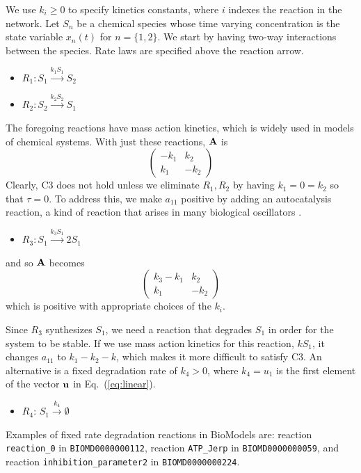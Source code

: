 \documentclass{bmcart}
\newcommand{\eqn}[1]{Eq.~(\ref{#1})}
\begin{document}
We use $k_i \geq 0$ to specify kinetics constants, where $i$ indexes the reaction in the network. Let $S_n$ be a chemical species whose time varying concentration is the state variable $x_n(t)$ for $n=\{1,2\}.$ We start by having two-way interactions between the species. Rate laws are specified above the reaction arrow.
\begin{itemize}
    \item $R_1: S_1 \xrightarrow{k_1 S_1} S_2$
    \item $R_2: S_2 \xrightarrow{k_2 S_2} S_1$
\end{itemize}
The foregoing reactions have mass action kinetics, which is widely used in models of chemical systems.
With just these reactions, ${\bf A}$ is
$$\left( \begin{matrix}
     - k_1 & k_2  \\
     k_1 & -k_2 
\end{matrix} \right)$$
Clearly, C3 does not hold unless we eliminate $R_1, R_2$ by having $k_1 = 0 = k_2$ so that $\tau = 0.$ To address this, we make $a_{11}$ positive by adding an autocatalysis reaction, a kind of reaction that
arises in many biological oscillators \cite{novichkov_autocatalytic_2021}.
\begin{itemize}
    \item $R_3: S_1 \xrightarrow{k_3 S_1} 2 S_1$
\end{itemize}
and so ${\bf A}$ becomes
$$\left( \begin{matrix}
     k_3 - k_1 & k_2  \\
     k_1 & -k_2
\end{matrix} \right)$$
which is positive with appropriate choices of the $k_i$.

Since $R_3$ synthesizes $S_1$, we need a reaction that degrades $S_1$ in order for the system to be stable. If we use mass action kinetics for this reaction, $kS_1$, it changes $a_{11}$ to $k_1-k_2-k$, which makes it more difficult to satisfy C3. An alternative is a fixed degradation rate of $k_4 > 0$, where $k_4 = u_1$ is the first element of the vector ${\bf u}$ in \eqn{eq:linear}.
\begin{itemize}
    \item $R_4$: $S_1\xrightarrow{k_4}\emptyset$
\end{itemize}
Examples of fixed rate degradation reactions in BioModels are: reaction {\tt reaction\_0} in {\tt BIOMD0000000112}, reaction
{\tt ATP\_Jerp} in {\tt BIOMD0000000059},
and reaction
\linebreak
{\tt inhibition\_parameter2} in {\tt BIOMD0000000224}.
\end{document}

